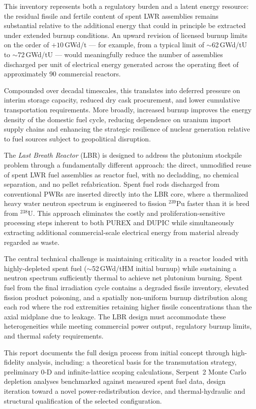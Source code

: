 This inventory represents both a regulatory burden and a latent energy resource: the residual fissile and fertile content of spent LWR assemblies remains substantial relative to the additional energy that could in principle be extracted under extended burnup conditions. An upward revision of licensed burnup limits on the order of $+10$\,GWd/t --- for example, from a typical limit of $\sim$62\,GWd/tU to $\sim$72\,GWd/tU --- would meaningfully reduce the number of assemblies discharged per unit of electrical energy generated across the operating fleet of approximately 90 commercial reactors. 

Compounded over decadal timescales, this translates into deferred pressure on interim storage capacity, reduced dry cask procurement, and lower cumulative transportation requirements. More broadly, increased burnup improves the energy density of the domestic fuel cycle, reducing dependence on uranium import supply chains and enhancing the strategic resilience of nuclear generation relative to fuel sources subject to geopolitical disruption.


The \textit{Last Breath Reactor} (LBR) is designed to address the plutonium stockpile problem through a fundamentally different approach: the direct, unmodified reuse of spent LWR fuel assemblies as reactor fuel, with no decladding, no chemical separation, and no pellet refabrication. Spent fuel rods discharged from conventional PWRs are inserted directly into the LBR core, where a thermalized heavy water neutron spectrum is engineered to fission $^{239}$Pu faster than it is bred from $^{238}$U. This approach eliminates the costly and proliferation-sensitive processing steps inherent to both PUREX and DUPIC while simultaneously extracting additional commercial-scale electrical energy from material already regarded as waste.


The central technical challenge is maintaining criticality in a reactor loaded with highly-depleted spent fuel ($\sim$52\,GWd/tHM initial burnup) while sustaining a neutron spectrum sufficiently thermal to achieve net plutonium burning. Spent fuel from the final irradiation cycle contains a degraded fissile inventory, elevated fission product poisoning, and a spatially non-uniform burnup distribution along each rod where the rod extremities retaining higher fissile concentrations than the axial midplane due to leakage. The LBR design must accommodate these heterogeneities while meeting commercial power output, regulatory burnup limits, and thermal safety requirements.

This report documents the full design process from initial concept through high-fidelity analysis, including: a theoretical basis for the transmutation strategy, preliminary 0-D and infinite-lattice scoping calculations, Serpent~2 Monte Carlo depletion analyses benchmarked against measured spent fuel data, design iteration toward a novel power-redistribution device, and thermal-hydraulic and structural qualification of the selected configuration.

